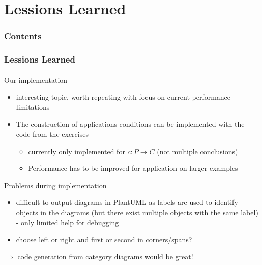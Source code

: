 \documentclass[32pt,t]{beamer}
\begin{document}
\section{Lessions Learned}
	\begin{frame}
		\frametitle{Contents}
		\tableofcontents[currentsection]
	\end{frame}
	
	\begin{frame}
		\frametitle{Lessions Learned}
		\framesubtitle{}
		\begin{block}{Our implementation}
			\begin{itemize}
				\item interesting topic, worth repeating with focus on current performance limitations
				\item The construction of applications conditions can be implemented with the code from the exercises
				\begin{itemize}
					\item currently only implemented for $c: P \rightarrow C$ (not multiple conclusions)
					\item Performance has to be improved for application on larger examples
				\end{itemize}
			\end{itemize}
		\end{block}
	
		\begin{block}{Problems during implementation}
			\begin{itemize}
				\item difficult to output diagrams in PlantUML as labels are used to identify objects in the diagrams (but there exist multiple objects with the same label) - only limited help for debugging
				\item choose left or right and first or second in corners/spans?
			\end{itemize}
			$\Rightarrow$ code generation from category diagrams would be great!
		\end{block}
	\end{frame}		
	
\end{document}
